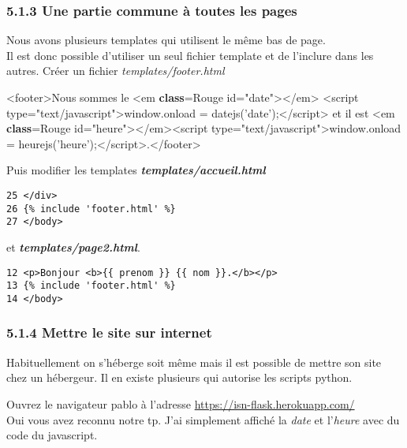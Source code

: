 \documentclass{article}
\newenvironment{Shaded}{}{}
\newcommand{\KeywordTok}[1]{\textcolor[rgb]{0.00,0.44,0.13}{\textbf{{#1}}}}
\newcommand{\DataTypeTok}[1]{\textcolor[rgb]{0.56,0.13,0.00}{{#1}}}
\newcommand{\StringTok}[1]{\textcolor[rgb]{0.25,0.44,0.63}{{#1}}}
\newcommand{\NormalTok}[1]{{#1}}
\begin{document}
\subsubsection{5.1.3 Une partie commune à toutes les
pages}\label{une-partie-commune-uxe0-toutes-les-pages}

Nous avons plusieurs templates qui utilisent le même bas de page.\\Il
est donc possible d'utiliser un seul fichier template et de l'inclure
dans les autres. Créer un fichier \emph{templates/footer.html}

\begin{Shaded}
\begin{Highlighting}[]
\NormalTok{<footer>Nous sommes le <em }\KeywordTok{class}\NormalTok{=Rouge }\DataTypeTok{id}\NormalTok{=}\StringTok{"date"}\NormalTok{></em> <script }\DataTypeTok{type}\NormalTok{=}\StringTok{"text/javascript"}\NormalTok{>window.onload = datejs(}\StringTok{'date'}\NormalTok{);</script> et il est <em }\KeywordTok{class}\NormalTok{=Rouge }\DataTypeTok{id}\NormalTok{=}\StringTok{"heure"}\NormalTok{></em><script }\DataTypeTok{type}\NormalTok{=}\StringTok{"text/javascript"}\NormalTok{>window.onload = heurejs(}\StringTok{'heure'}\NormalTok{);</script>.</footer>}
\end{Highlighting}
\end{Shaded}

Puis modifier les templates \textbf{\emph{templates/accueil.html}}

\begin{verbatim}
25 </div>
26 {% include 'footer.html' %}
27 </body>
\end{verbatim}

et \textbf{\emph{templates/page2.html}}.

\begin{verbatim}
12 <p>Bonjour <b>{{ prenom }} {{ nom }}.</b></p>
13 {% include 'footer.html' %}
14 </body>
\end{verbatim}

\subsubsection{5.1.4 Mettre le site sur
internet}\label{mettre-le-site-sur-internet}

Habituellement on s'héberge soit même mais il est possible de mettre son
site chez un hébergeur. Il en existe plusieurs qui autorise les scripts
python.

Ouvrez le navigateur pablo à l'adresse
\url{https://isn-flask.herokuapp.com/}\\Oui vous avez reconnu notre tp.
J'ai simplement affiché la \emph{date} et l'\emph{heure} avec du code du
javascript.
\end{document}
